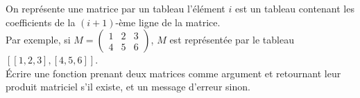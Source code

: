 \exer{}
\setcounter{numques}{0}

On représente une matrice par un tableau l'élément $i$ est un tableau
contenant les coefficients de la $(i+1)$-ème ligne de la matrice.\\
Par exemple, si $M=\begin{pmatrix} 1&2&3\\4&5&6\end{pmatrix}$, $M$ est
représentée par le tableau $[[1,2,3],[4,5,6]]$.\\
Écrire une fonction prenant deux matrices comme argument et retournant leur
produit matriciel s'il existe, et un message d'erreur sinon.